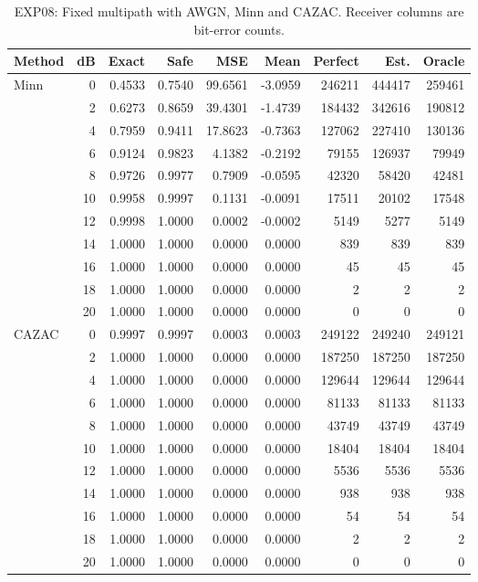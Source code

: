 \begin{table}[!p]
\centering
\caption{EXP08: Fixed multipath with AWGN, Minn and CAZAC. Receiver columns are bit-error counts.}
\label{app:exp08-1-1}
\small
\setlength{\tabcolsep}{3pt}
\renewcommand{\arraystretch}{1.05}
\begin{tabular}{lrrrrrrrr}
\hline
Method & dB & Exact & Safe & MSE & Mean & Perfect & Est. & Oracle \\
\hline
Minn & 0 & 0.4533 & 0.7540 & 99.6561 & -3.0959 & 246211 & 444417 & 259461 \\
 & 2 & 0.6273 & 0.8659 & 39.4301 & -1.4739 & 184432 & 342616 & 190812 \\
 & 4 & 0.7959 & 0.9411 & 17.8623 & -0.7363 & 127062 & 227410 & 130136 \\
 & 6 & 0.9124 & 0.9823 & 4.1382 & -0.2192 & 79155 & 126937 & 79949 \\
 & 8 & 0.9726 & 0.9977 & 0.7909 & -0.0595 & 42320 & 58420 & 42481 \\
 & 10 & 0.9958 & 0.9997 & 0.1131 & -0.0091 & 17511 & 20102 & 17548 \\
 & 12 & 0.9998 & 1.0000 & 0.0002 & -0.0002 & 5149 & 5277 & 5149 \\
 & 14 & 1.0000 & 1.0000 & 0.0000 & 0.0000 & 839 & 839 & 839 \\
 & 16 & 1.0000 & 1.0000 & 0.0000 & 0.0000 & 45 & 45 & 45 \\
 & 18 & 1.0000 & 1.0000 & 0.0000 & 0.0000 & 2 & 2 & 2 \\
 & 20 & 1.0000 & 1.0000 & 0.0000 & 0.0000 & 0 & 0 & 0 \\
\hline
CAZAC & 0 & 0.9997 & 0.9997 & 0.0003 & 0.0003 & 249122 & 249240 & 249121 \\
 & 2 & 1.0000 & 1.0000 & 0.0000 & 0.0000 & 187250 & 187250 & 187250 \\
 & 4 & 1.0000 & 1.0000 & 0.0000 & 0.0000 & 129644 & 129644 & 129644 \\
 & 6 & 1.0000 & 1.0000 & 0.0000 & 0.0000 & 81133 & 81133 & 81133 \\
 & 8 & 1.0000 & 1.0000 & 0.0000 & 0.0000 & 43749 & 43749 & 43749 \\
 & 10 & 1.0000 & 1.0000 & 0.0000 & 0.0000 & 18404 & 18404 & 18404 \\
 & 12 & 1.0000 & 1.0000 & 0.0000 & 0.0000 & 5536 & 5536 & 5536 \\
 & 14 & 1.0000 & 1.0000 & 0.0000 & 0.0000 & 938 & 938 & 938 \\
 & 16 & 1.0000 & 1.0000 & 0.0000 & 0.0000 & 54 & 54 & 54 \\
 & 18 & 1.0000 & 1.0000 & 0.0000 & 0.0000 & 2 & 2 & 2 \\
 & 20 & 1.0000 & 1.0000 & 0.0000 & 0.0000 & 0 & 0 & 0 \\
\hline
\end{tabular}
\end{table}

\clearpage
